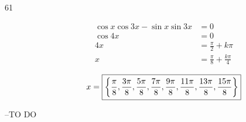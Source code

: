 \documentclass{exam}
\begin{document}
\begin{description}
      \item[61] 
        \begin{align*}
          \cos x \cos 3x - \sin x \sin 3x & = 0 \\
          \cos 4x                         & = 0 \\
          4x                              & = \frac{\pi}{2} + k \pi \\
          x                               & = \frac{\pi}{8} + \frac{k \pi}{4} \\
        \end{align*}
        \[
          x = \boxed{ \left\{ \frac{\pi}{8}, \frac{3 \pi}{8}, \frac{5 \pi}{8}, \frac{7 \pi}{8}, 
                                \frac{9 \pi}{8}, \frac{11 \pi}{8}, \frac{13 \pi}{8}, \frac{15 \pi}{8} \right\} } \\
        \]

    \end{description}

  \else
    \vspace{5 cm}

    \begin{quote}
      \begin{em}
      \end{em}
    \end{quote}
    \hspace{1 cm} --TO DO
  \fi
\end{document}
